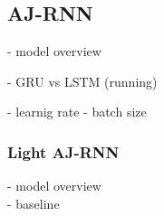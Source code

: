 \subsection{AJ-RNN}
- model overview

- GRU vs LSTM (running)

- learnig rate
- batch size 

\subsubsection{Light AJ-RNN}
- model overview\\
- baseline